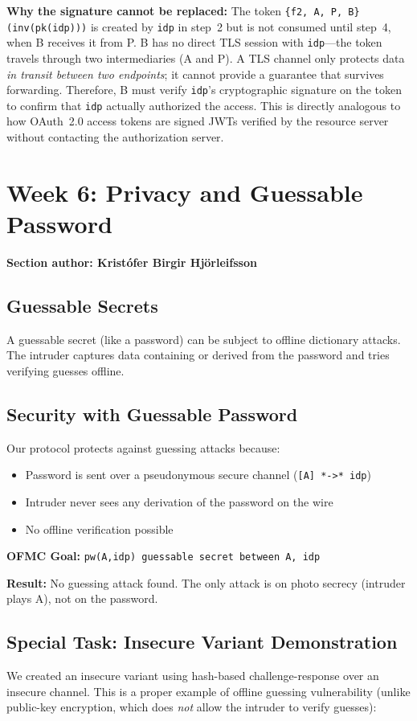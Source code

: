 \documentclass[11pt,a4paper]{article}
\newcommand{\sectionauthor}[1]{\noindent\textbf{Section author: #1}\par\medskip}
\begin{document}
\textbf{Why the signature cannot be replaced:}
The token \texttt{\{f2, A, P, B\}(inv(pk(idp)))} is created by \texttt{idp} in step~2 but is
not consumed until step~4, when B receives it from P. B has no direct TLS session with
\texttt{idp}---the token travels through two intermediaries (A and P). A TLS channel only
protects data \emph{in transit between two endpoints}; it cannot provide a guarantee that
survives forwarding. Therefore, B must verify \texttt{idp}'s cryptographic signature on the
token to confirm that \texttt{idp} actually authorized the access. This is directly
analogous to how OAuth~2.0 access tokens are signed JWTs verified by the resource server
without contacting the authorization server.

\section{Week 6: Privacy and Guessable Password}
\sectionauthor{Kristófer Birgir Hjörleifsson}

\subsection{Guessable Secrets}
A guessable secret (like a password) can be subject to offline dictionary attacks. The intruder
captures data containing or derived from the password and tries verifying guesses offline.

\subsection{Security with Guessable Password}
Our protocol protects against guessing attacks because:
\begin{itemize}[leftmargin=*]
  \item Password is sent over a pseudonymous secure channel (\texttt{[A] *->* idp})
  \item Intruder never sees any derivation of the password on the wire
  \item No offline verification possible
\end{itemize}

\textbf{OFMC Goal:} \texttt{pw(A,idp) guessable secret between A, idp}

\textbf{Result:} No guessing attack found. The only attack is on photo secrecy (intruder plays A),
not on the password.

\subsection{Special Task: Insecure Variant Demonstration}
We created an insecure variant using hash-based challenge-response over an insecure channel.
This is a proper example of offline guessing vulnerability (unlike public-key encryption,
which does \emph{not} allow the intruder to verify guesses):
\end{document}
